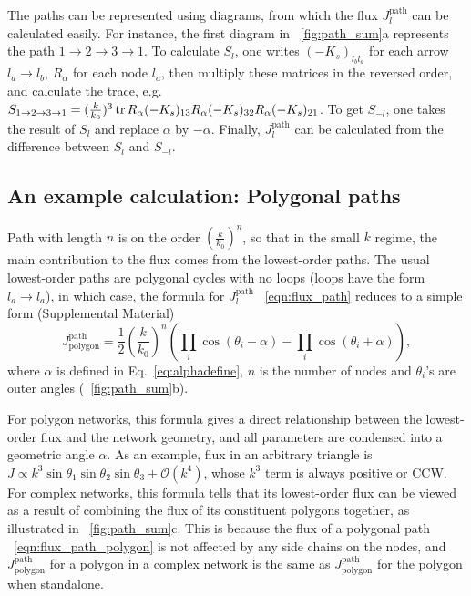 \documentclass[
 preprint,
 preprintnumbers,
 amsmath,amssymb,
 aps,
 pre,
 longbibliography,
 superscriptaddress,
 10pt, twocolumn
]{revtex4-1}
\begin{document}
The paths can be represented using diagrams, from which the flux $J^\text{path}_l$ can be calculated easily. For instance, the first diagram in \figurename~\ref{fig:path_sum}a represents the path $1\rightarrow 2\rightarrow 3\rightarrow 1$. To calculate $S_l$, one writes $(-K_s)_{l_bl_a}$ for each arrow $l_a\rightarrow l_b$, $R_\alpha$ for each node $l_a$, then multiply these matrices in the reversed order, and calculate the trace, e.g. $S_{1\rightarrow 2\rightarrow 3\rightarrow 1} = (\frac{k}{k_0})^3 \tr R_\alpha (-K_s)_{13} R_\alpha (-K_s)_{32} R_\alpha (-K_s)_{21}$. To get $S_{-l}$, one takes the result of $S_l$ and replace $\alpha$ by $-\alpha$. Finally, $J^\text{path}_l$ can be calculated from the difference between $S_l$ and $S_{-l}$.

\subsection{An example calculation: Polygonal paths}
Path with length $n$ is on the order $(\frac{k}{k_0})^n$, so that in the small $k$ regime, the main contribution to the flux comes from the lowest-order paths.
The usual lowest-order paths are polygonal cycles with no loops (loops have the form $l_a\rightarrow l_a$), in which case, the formula for $J^\text{path}_l$ \eqnname~\eqref{eqn:flux_path} reduces to a simple form (Supplemental Material)
\begin{equation} \label{eqn:flux_path_polygon}
    J^\text{path}_\text{polygon} = \frac{1}{2} (\frac{k}{k_0})^n (\prod_i \cos(\theta_i - \alpha) - \prod_i \cos(\theta_i + \alpha)),
\end{equation}
where $\alpha$ is defined in Eq.~\ref{eq:alphadefine}, $n$ is the number of nodes and $\theta_i$'s are outer angles (\figurename~\ref{fig:path_sum}b).

For polygon networks, this formula gives a direct relationship between the lowest-order flux and the network geometry, and all parameters are condensed into a geometric angle $\alpha$. As an example, flux in an arbitrary triangle is $J \propto k^3 \sin\theta_1\sin\theta_2\sin\theta_3 + \mathcal{O}(k^4)$, whose $k^3$ term is always positive or CCW.
For complex networks, this formula tells that its lowest-order flux can be viewed as a result of combining the flux of its constituent polygons together, as illustrated in \figurename~\ref{fig:path_sum}c. This is because the flux of a polygonal path \eqnname~\eqref{eqn:flux_path_polygon} is not affected by any side chains on the nodes, and $J^\text{path}_\text{polygon}$ for a polygon in a complex network is the same as $J^\text{path}_\text{polygon}$ for the polygon when standalone.
\end{document}
